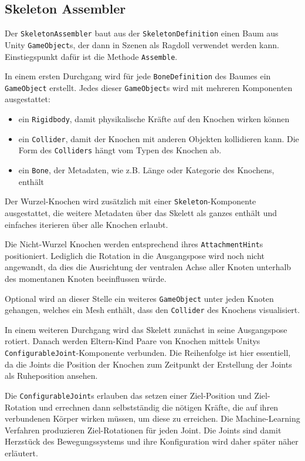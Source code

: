 \subsection{Skeleton Assembler}
Der \texttt{Skeleton\-Assembler} baut aus der \texttt{Skeleton\-Definition} einen Baum aus Unity \texttt{Game\-Object}s, der dann in Szenen als Ragdoll verwendet werden kann. Einstiegspunkt dafür ist die Methode \texttt{Assemble}.

In einem ersten Durchgang wird für jede \texttt{Bone\-Definition} des Baumes ein \texttt{Game\-Object} erstellt. Jedes dieser \texttt{GameObject}s wird mit mehreren Komponenten ausgestattet:
\begin{itemize}
    \item ein \texttt{Rigidbody}, damit physikalische Kräfte auf den Knochen wirken können
    \item ein \texttt{Collider}, damit der Knochen mit anderen Objekten kollidieren kann. Die Form des \texttt{Colliders} hängt vom Typen des Knochen ab.
    \item ein \texttt{Bone}, der Metadaten, wie z.B. Länge oder Kategorie des Knochens, enthält
\end{itemize}
Der Wurzel-Knochen wird zusätzlich mit einer \texttt{Skeleton}-Komponente ausgestattet, die weitere Metadaten über das Skelett als ganzes enthält und einfaches iterieren über alle Knochen erlaubt.

Die Nicht-Wurzel Knochen werden entsprechend ihres \texttt{Attachment\-Hint}s positioniert.
Lediglich die Rotation in die Ausgangspose wird noch nicht angewandt, da dies die Ausrichtung der ventralen Achse aller Knoten unterhalb des momentanen Knoten beeinflussen würde.

Optional wird an dieser Stelle ein weiteres \texttt{Game\-Object} unter jeden Knoten gehangen, welches ein Mesh enthält, dass den \texttt{Collider} des Knochens visualisiert.

In einem weiteren Durchgang wird das Skelett zunächst in seine Ausgangspose rotiert.
Danach werden Eltern-Kind Paare von Knochen mittels Unitys \texttt{Configurable\-Joint}-Komponente verbunden.
Die Reihenfolge ist hier essentiell, da die Joints die Position der Knochen zum Zeitpunkt der Erstellung der Joints als Ruheposition ansehen.

Die \texttt{Configurable\-Joint}s erlauben das setzen einer Ziel-Position und Ziel-Rotation und errechnen dann selbstständig die nötigen Kräfte, die auf ihren verbundenen Körper wirken müssen, um diese zu erreichen.
Die Machine-Learning Verfahren produzieren Ziel-Rotationen für jeden Joint.
Die Joints sind damit Herzstück des Bewegungssystems und ihre Konfiguration wird daher später näher erläutert.

